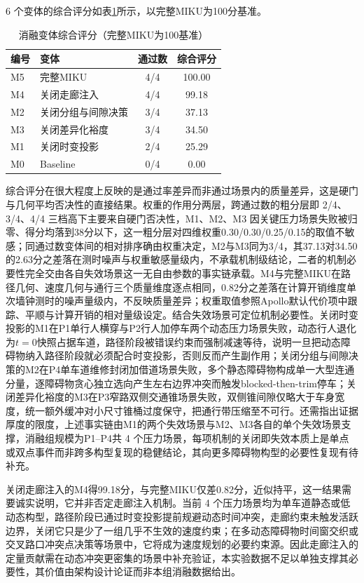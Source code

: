\documentclass[a4paper,zihao=5]{ctexart}
\theoremstyle{definition}
\begin{document}
6 个变体的综合评分如表\ref{tab:exp_ablation_score}所示，以完整MIKU为100分基准。

\begin{table}[htbp]
\centering
\caption{消融变体综合评分（完整MIKU为100基准）}
\label{tab:exp_ablation_score}
\small
\begin{tabular}{llcc}
\toprule
\textbf{编号} & \textbf{变体} & \textbf{通过数} & \textbf{综合评分} \\
\midrule
M5 & 完整MIKU             & 4/4 & 100.00 \\
M4 & 关闭走廊注入         & 4/4 & 99.18 \\
M2 & 关闭分组与间隙决策   & 3/4 & 37.13 \\
M3 & 关闭差异化裕度       & 3/4 & 34.50 \\
M1 & 关闭时变投影         & 2/4 & 25.29 \\
M0 & Baseline             & 0/4 & 0.00 \\
\bottomrule
\end{tabular}
\end{table}

综合评分在很大程度上反映的是通过率差异而非通过场景内的质量差异，这是硬门与几何平均否决性的直接结果。权重的作用分两层，跨通过数的粗分层即 2/4、3/4、4/4 三档高下主要来自硬门否决性，M1、M2、M3 因关键压力场景失败被归零、得分均落到38分以下，这一粗分层对四维权重0.30/0.30/0.25/0.15的取值不敏感；同通过数变体间的相对排序确由权重决定，M2与M3同为3/4，其37.13对34.50的2.63分之差落在测时噪声与权重敏感量级内，不承载机制级结论，二者的机制必要性完全交由各自失效场景这一无自由参数的事实链承载。M4与完整MIKU在路径几何、速度几何与通行三个质量维度逐点相同，0.82分之差落在计算开销维度单次墙钟测时的噪声量级内，不反映质量差异；权重取值参照Apollo默认代价项中跟踪、平顺与计算开销的相对量级设定。结合失效场景可定位机制必要性。关闭时变投影的M1在P1单行人横穿与P2行人加停车两个动态压力场景失败，动态行人退化为$t=0$快照占据车道，路径阶段被错误约束而强制减速等待，说明一旦把动态障碍物纳入路径阶段就必须配合时变投影，否则反而产生副作用；关闭分组与间隙决策的M2在P4单车道维修封闭加借道场景失败，多个静态障碍物构成单一大型连通分量，逐障碍物贪心独立选向产生左右边界冲突而触发blocked-then-trim停车；关闭差异化裕度的M3在P3窄路双侧交通锥场景失败，双侧锥间隙仅略大于车身宽度，统一额外缓冲对小尺寸锥桶过度保守，把通行带压缩至不可行。还需指出证据厚度的限度，上述事实链由M1的两个失效场景与M2、M3各自的单个失效场景支撑，消融组规模为P1--P4共 4 个压力场景，每项机制的关闭即失效本质上是单点或双点事件而非跨多构型复现的稳健结论，其向更多障碍物构型的必要性复现有待补充。

关闭走廊注入的M4得99.18分，与完整MIKU仅差0.82分，近似持平，这一结果需要诚实说明，它并非否定走廊注入机制。当前 4 个压力场景均为单车道静态或低动态构型，路径阶段已通过时变投影提前规避动态时间冲突，走廊约束未触发活跃边界，关闭它只是少了一组几乎不生效的速度约束；在多动态障碍物时间窗交织或交叉路口冲突点决策等场景中，它将成为速度规划的必要约束源。因此走廊注入的定量贡献需在动态冲突更密集的场景中补充验证，本实验数据不足以单独支撑其必要性，其价值由架构设计论证而非本组消融数据给出。
\end{document}
